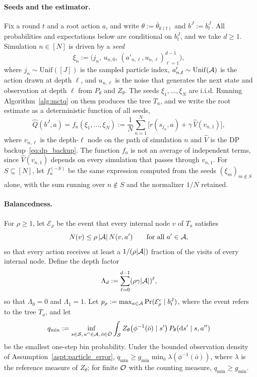 \paragraph{Seeds and the estimator.}
Fix a round $t$ and a root action $a$, and write $\theta:=\bar\theta_{k(t)}$ and $b^J:=b_t^J$.
All probabilities and expectations below are conditional on $b_t^J$, and we take $d\ge1$.
Simulation $n\in[N]$ is driven by a \emph{seed}
\begin{equation}\label{eq:mc_seed}
\xi_n:=\bigl(j_n,\,u_{n,0},\,(a'_{n,\ell},u_{n,\ell})_{\ell=1}^{d-1}\bigr),
\end{equation}
where $j_n\sim\mathrm{Unif}([J])$ is the sampled particle index, $a'_{n,\ell}\sim\mathrm{Unif}({\mathcal{A}})$ is the action drawn at depth $\ell$, and $u_{n,\ell}$ is the noise that generates the next state and observation at depth $\ell$ from $P_\theta$ and $Z_\theta$.
The seeds $\xi_1,\ldots,\xi_N$ are i.i.d.
Running Algorithm~\ref{alg:mctq} on them produces the tree $T_a$, and we write the root estimate as a deterministic function of all seeds,
\begin{equation}\label{eq:mc_fa}
\widehat Q(b^J,a)=f_a(\xi_1,\ldots,\xi_N):=\frac1N\sum_{n=1}^N\bigl[r(s_{j_n},a)+\gamma\,\hat V(v_{n,1})\bigr],
\end{equation}
where $v_{n,\ell}$ is the depth-$\ell$ node on the path of simulation $n$ and $\hat V$ is the DP backup~\eqref{eq:dp_backup}.
The function $f_a$ is not an average of independent terms, since $\hat V(v_{n,1})$ depends on every simulation that passes through $v_{n,1}$.
For $S\subseteq[N]$, let $f_a^{(-S)}$ be the same expression computed from the seeds $(\xi_m)_{m\notin S}$ alone, with the sum running over $n\notin S$ and the normalizer $1/N$ retained.

\paragraph{Balancedness.}
For $\rho\ge1$, let $\mathcal E_\rho$ be the event that every internal node $v$ of $T_a$ satisfies
\begin{equation}\label{eq:balanced}
N(v)\le\rho\,|{\mathcal{A}}|\,N(v,a')\qquad\text{for all }a'\in{\mathcal{A}},
\end{equation}
so that every action receives at least a $1/(\rho|{\mathcal{A}}|)$ fraction of the visits of every internal node.
Define the depth factor
\begin{equation}\label{eq:Lambda_d_def}
\Lambda_d:=\sum_{\ell=0}^{d-1}(\rho\gamma|{\mathcal{A}}|)^{\ell},
\end{equation}
so that $\Lambda_0=0$ and $\Lambda_1=1$.
Let $p_\rho:=\max_{a\in{\mathcal{A}}}\Pr(\mathcal E_\rho^c\mid b_t^J)$, where the event refers to the tree $T_a$, and let
\[
q_{\min}:=\inf_{s\in{\mathcal{S}},\,a''\in{\mathcal{A}},\,\bar o\in\bar{{\mathcal{O}}}}\int_{{\mathcal{S}}}Z_\theta\bigl(\phi^{-1}(\bar o)\mid s'\bigr)\,P_\theta(\mathrm ds'\mid s,a'')
\]
be the smallest one-step bin probability.
Under the bounded observation density of Assumption~\ref{aspt:particle_error}, $q_{\min}\ge g_{\min}\min_{\bar o}\lambda(\phi^{-1}(\bar o))$, where $\lambda$ is the reference measure of $Z_\theta$; for finite ${\mathcal{O}}$ with the counting measure, $q_{\min}\ge g_{\min}$.

